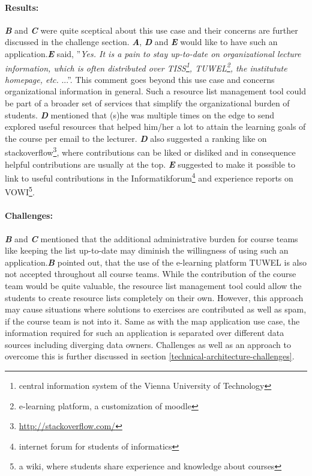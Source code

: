\documentclass{article}
\begin{document}
\paragraph{Results:}
\textit{\textbf{B}} and \textit{\textbf{C}} were quite sceptical about this use case and their concerns are further discussed in the challenge section. \textit{\textbf{A}}, \textit{\textbf{D}} and \textit{\textbf{E}} would like to have such an application.\textit{\textbf{E}} said, ''\textit{Yes. It is a pain to stay up-to-date on organizational lecture information, which is often distributed over TISS\footnote{central information system of the Vienna University of Technology}, TUWEL\footnote{e-learning platform, a customization of moodle}, the institutute homepage, etc.} ...''. This comment goes beyond this use case and concerns organizational information in general. Such a resource list management tool could be part of a broader set of services that simplify the organizational burden of students. \textit{\textbf{D}} mentioned that (s)he was multiple times on the edge to send explored useful resources that helped him/her a lot to attain the learning goals of the course per email to the lecturer. \textit{\textbf{D}} also suggested a ranking like on stackoverflow\footnote{\url{http://stackoverflow.com/}}, where contributions can be liked or disliked and in consequence helpful contributions are usually at the top. \textit{\textbf{E}} suggested to make it possible to link to useful contributions in the Informatikforum\footnote{internet forum for students of informatics} and experience reports on VOWI\footnote{a wiki, where students share experience and knowledge about courses}.

\paragraph{Challenges:}
\textit{\textbf{B}} and \textit{\textbf{C}} mentioned that the additional administrative burden for course teams like keeping the list up-to-date may diminish the willingness of using such an application.\textit{\textbf{B}} pointed out, that the use of the e-learning platform TUWEL is also not accepted throughout all course teams. While the contribution of the course team would be quite valuable, the resource list management tool could allow the students to create resource lists completely on their own. However, this approach may cause situations where solutions to exercises are contributed as well as spam, if the course team is not into it. Same as with the map application use case, the information required for such an application is separated over different data sources including diverging data owners. Challenges as well as an approach to overcome this is further discussed in section \ref{technical-architecture-challenges}.
\end{document}
